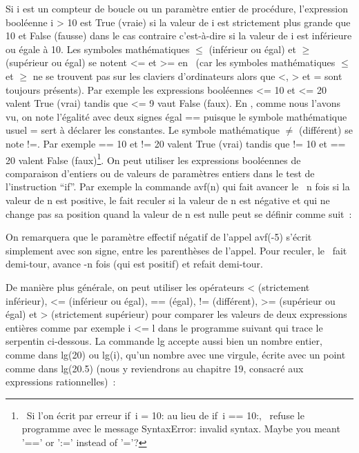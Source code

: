Si {\idt i} est un compteur de boucle ou un paramètre entier de procédure,
l'expression booléenne {\idt i > 10} est {\mcl True} (vraie)
si la valeur de {\idt i} est strictement plus grande que 10 et {\mcl
False} (fausse) dans le cas contraire c'est-à-dire si la valeur de {\idt
i} est inférieure ou égale à 10.  Les symboles mathématiques $\leq$
(inférieur ou égal) et $\geq$ (supérieur ou égal) se notent {\idt <=} et
{\idt >=} en \python\ (car les symboles mathématiques $\leq$ et $\geq$ ne
se trouvent pas sur les claviers d'ordinateurs alors que {\idt <}, {\idt >}
et {\idt =} sont toujours présents).  Par exemple les expressions
booléennes { <= 10} et { <= 20} valent {\mcl True}
(vrai) tandis que { <= 9} vaut {\mcl False} (faux).  En
\python, comme nous l'avons vu, on note l'égalité avec deux signes égal {\idt ==}
puisque le symbole mathématique usuel {\idt =} sert à déclarer les constantes.
Le symbole mathématique $\neq$ (différent) se note {\ttfamily\idt !=}.
Par exemple { == 10} et {\ttfamily{} != 20} valent {\mcl True}
(vrai) tandis que {\ttfamily{} != 10} et { == 20} valent {\mcl
False} (faux)\footnote{\ Si l'on écrit par erreur {\mcl if}\ {\idt i = 10:}
au lieu de {\mcl if}\ {\idt i == 10:}, \python\ refuse le programme avec
le message {\idt SyntaxError: invalid syntax. Maybe you meant '==' or ':='
instead of '='?}}.
On peut utiliser les expressions booléennes de
comparaison d'entiers ou de valeurs de paramètres entiers dans le test
de l'instruction ``if''.  Par exemple la commande {\idt avf(n)} qui
fait avancer le \robot\ {\idt n} fois si la valeur de {\idt n} est
positive, le fait reculer si la valeur de {\idt n} est négative et qui
ne change pas sa position quand la valeur de {\idt n} est nulle peut
se définir comme suit~:



\noindent On remarquera que le paramètre effectif négatif de l'appel
{\idt avf(-5)} s'écrit simplement avec son signe, entre les parenthèses de
l'appel. Pour reculer, le \robot\ fait demi-tour, avance {\idt -n} fois
(qui est positif) et refait demi-tour.

De manière plus générale, on peut utiliser les opérateurs {\idt <} (strictement inférieur), {\idt <=} (inférieur ou égal),
{\idt ==} (égal), {\ttfamily\idt !=} (différent), {\idt >=} (supérieur ou égal) et {\idt >} (strictement supérieur) pour comparer les valeurs
de deux expressions entières comme par exemple {\idt i <= l} dans le programme suivant qui trace le serpentin
ci-dessous. La commande {\idt lg} accepte aussi bien un nombre entier, comme
dans {\idt lg(20)} ou {\idt lg(i)}, qu'un nombre avec une virgule, écrite
avec un point comme dans {\idt lg(20.5)} (nous y reviendrons
au chapitre 19, consacré aux expressions rationnelles)~:

